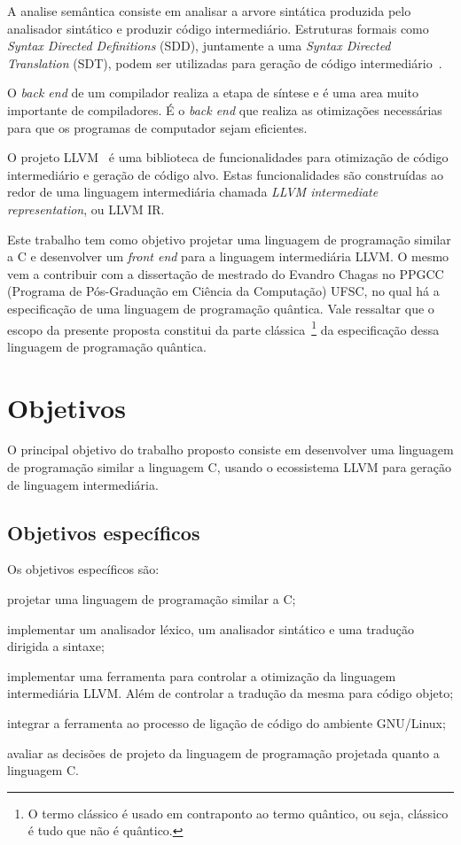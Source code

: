 \documentclass[
  12pt,
  openright,
  twoside,
  a4paper,
  english,
  brazil
]{abntex2}
\begin{document}
A analise semântica consiste em analisar a arvore sintática produzida pelo analisador sintático e produzir código intermediário.
Estruturas formais como \textit{Syntax Directed Definitions} (SDD), juntamente a uma \textit{Syntax Directed Translation} (SDT), podem ser utilizadas para geração de código intermediário~\cite{Aho:2006:CPT:1177220}.

O \textit{back end} de um compilador realiza a etapa de síntese e é uma area muito importante de compiladores.
É o \textit{back end} que realiza as otimizações necessárias para que os programas de computador sejam eficientes.

O projeto LLVM~\cite{lattner2004llvm} é uma biblioteca de funcionalidades para otimização de código intermediário e geração de código alvo.
Estas funcionalidades são construídas ao redor de uma linguagem intermediária chamada \textit{LLVM intermediate representation}, ou LLVM IR\@.

Este trabalho tem como objetivo projetar uma linguagem de programação similar a C e desenvolver um \textit{front end} para a linguagem intermediária LLVM\@.
O mesmo vem a contribuir com a dissertação de mestrado do Evandro Chagas no PPGCC (Programa de Pós-Graduação em Ciência da Computação) UFSC, no qual há a especificação de uma linguagem de programação quântica.
Vale ressaltar que o escopo da presente proposta constitui da parte clássica~\footnote{O termo clássico é usado em contraponto ao termo quântico, ou seja, clássico é tudo que não é quântico.} da especificação dessa linguagem de programação quântica.

\chapter{Objetivos}\label{cap:objetivos}

O principal objetivo do trabalho proposto consiste em desenvolver uma linguagem de programação similar a linguagem C, usando o ecossistema LLVM para geração de linguagem intermediária.

\section{Objetivos específicos}

Os objetivos específicos são:
\begin{alineas}
  \item projetar uma linguagem de programação similar a C\@;
  \item implementar um analisador léxico, um analisador sintático e uma tradução dirigida a sintaxe;
  \item implementar uma ferramenta para controlar a otimização da linguagem intermediária LLVM\@. Além de controlar a tradução da mesma para código objeto;
  \item integrar a ferramenta ao processo de ligação de código do ambiente GNU/Linux;
  \item avaliar as decisões de projeto da linguagem de programação projetada quanto a linguagem C.
\end{alineas}
\end{document}
